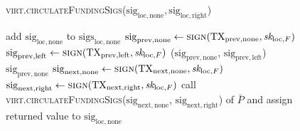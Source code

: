 \begin{figure}[H]
\begin{processbox}{\textsc{virt.circulateFundingSigs}($\mathrm{sig}_{\mathrm{loc},
  \mathrm{none}}, \mathrm{sig}_{\mathrm{loc}, \mathrm{right}}$)}
\begin{algorithmic}[1]
          \State {} 
          \State {}
          \State {}
          \State {}
          \State add $\mathrm{sig}_{\mathrm{loc}, \mathrm{none}}$ to
          $\mathrm{sigs}_{\mathrm{loc}, \mathrm{none}}$
        \EndIf
        \State $\mathrm{sig}_{\mathrm{prev}, \mathrm{none}} \gets
        \textsc{sign}(\mathrm{TX}_{\mathrm{prev}, \mathrm{none}},
        \textit{sk}_{\mathrm{loc}, F})$
          \State $\mathrm{sig}_{\mathrm{prev}, \mathrm{left}} \gets
          \textsc{sign}(\mathrm{TX}_{\mathrm{prev}, \mathrm{left}},
          \textit{sk}_{\mathrm{loc}, F})$
          \State \Return ($\mathrm{sig}_{\mathrm{prev}, \mathrm{none}}$,
          $\mathrm{sig}_{\mathrm{prev}, \mathrm{left}}$)
        \Else \: 
          \State \Return $\mathrm{sig}_{\mathrm{prev}, \mathrm{none}}$
        \EndIf
      \Else \: 
        \State $\mathrm{sig}_{\mathrm{next}, \mathrm{none}} \gets
        \textsc{sign}(\mathrm{TX}_{\mathrm{next}, \mathrm{none}},
        \textit{sk}_{\mathrm{loc}, F})$
        \label{code:virtual-layer:funding-sigs:funder-sign-none}
        \State $\mathrm{sig}_{\mathrm{next}, \mathrm{right}} \gets
        \textsc{sign}(\mathrm{TX}_{\mathrm{next}, \mathrm{right}},
        \textit{sk}_{\mathrm{loc}, F})$
        \label{code:virtual-layer:funding-sigs:funder-sign-right}
        \State call
        \textsc{virt.circulateFundingSigs}($\mathrm{sig}_{\mathrm{next},
        \mathrm{none}}$, $\mathrm{sig}_{\mathrm{next}, \mathrm{right}}$) of
        $\bar{P}$ and assign returned value to $\mathrm{sig}_{\mathrm{loc},
        \mathrm{none}}$

\end{algorithmic}
\end{processbox}
\end{figure}
